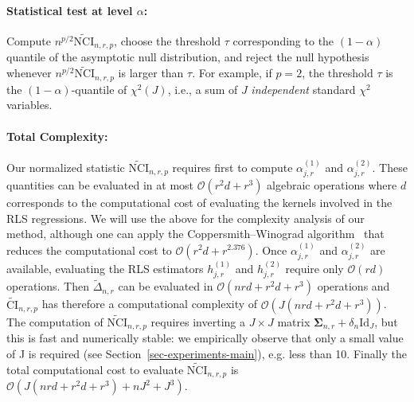 \paragraph{Statistical test at level $\alpha$:} Compute $n^{p/2}\widetilde{\text{NCI}}_{n,r,p}$, choose the threshold $\tau$ corresponding to the $(1-\alpha)$ quantile of the asymptotic null distribution, and reject the null hypothesis whenever  $n^{p/2}\widetilde{\text{NCI}}_{n,r,p}$ is larger than $\tau$. For example, if $p=2$,  the threshold $\tau$ is the $(1 -\alpha)$-quantile of $\chi^2(J)$, i.e., a sum of $J$ \emph{independent} standard $\chi^2 $ variables.

\paragraph{Total Complexity:} Our normalized statistic $\widetilde{\text{NCI}}_{n,r,p}$ requires first to compute $\alpha^{(1)}_{j,r}$ and $\alpha^{(2)}_{j,r}$. These quantities can be evaluated in at most $\mathcal{O}(r^2d+r^3)$ algebraic operations where $d$ corresponds to the computational cost of evaluating the kernels involved in the RLS regressions. We will use the above for the complexity analysis of our method, although one can apply the Coppersmith–Winograd algorithm~\citep{coppersmith1987matrix} that reduces the computational cost to $\mathcal{O}(r^2d+r^{2.376})$. Once $\alpha^{(1)}_{j,r}$ and  $\alpha^{(2)}_{j,r}$ are available, evaluating the RLS estimators $h_{j,r}^{(1)}$ and $h_{j,r}^{(2)}$ require only $\mathcal{O}(rd)$ operations. Then $\widetilde{\Delta}_{n,r}$ can be evaluated in $\mathcal{O}(nrd + r^2d + r^3)$ operations and $\widetilde{\text{CI}}_{n,r,p}$ has therefore a computational complexity of $\mathcal{O}(J(nrd + r^2d+r^3))$. The computation of $\widetilde{\text{NCI}}_{n,r,p}$ requires inverting a $J \times J$ matrix $\bm{\Sigma}_{n,r}+\delta_n\text{Id}_J$, but this is fast and numerically stable: we empirically observe that only a small value of J is required (see Section~\ref{sec-experiments-main}), e.g. less than 10.  Finally the total computational cost to evaluate $\widetilde{\text{NCI}}_{n,r,p}$ is $\mathcal{O}(J(nrd + r^2d + r^3) + nJ^2 + J^3)$.

